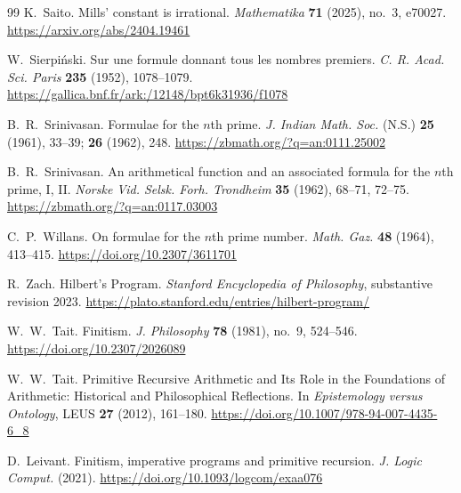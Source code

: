 \documentclass[11pt,reqno]{amsart}
\theoremstyle{blueplain}
\numberwithin{equation}{section}
\def\hyperlink#1#2{#2}}
\begin{document}
\begin{thebibliography}{99}
	K.~Saito.
	Mills' constant is irrational.
	\emph{Mathematika} \textbf{71} (2025), no.~3, e70027.
	\url{https://arxiv.org/abs/2404.19461}
	
	\hypertarget{abbr-source:Sierpinski1952}{}
	W.~Sierpi\'nski.
	Sur une formule donnant tous les nombres premiers.
	\hyperlink{abbr:journal-C-R-Acad-Sci-Paris}{\emph{C. R. Acad. Sci. Paris}} \textbf{235} (1952), 1078--1079.
	\url{https://gallica.bnf.fr/ark:/12148/bpt6k31936/f1078}
	
	\hypertarget{abbr-source:Srinivasan1961}{}
	B.~R.~Srinivasan.
	Formulae for the \(n\)th prime.
	\hyperlink{abbr:journal-J-Indian-Math-Soc}{\emph{J. Indian Math. Soc.}} (\hyperlink{abbr:N.S.}{N.S.}) \textbf{25} (1961), 33--39;
	\textbf{26} (1962), 248.
	\url{https://zbmath.org/?q=an:0111.25002}
	
	\hypertarget{abbr-source:Srinivasan1962}{}
	B.~R.~Srinivasan.
	An arithmetical function and an associated formula for the \(n\)th prime,
	I, II.
	\hyperlink{abbr:journal-Norske-Vid-Selsk-Forh-Trondheim}{\emph{Norske Vid. Selsk. Forh. Trondheim}}
	\textbf{35} (1962), 68--71, 72--75.
	\url{https://zbmath.org/?q=an:0117.03003}
	
	\hypertarget{abbr-source:Willans1964}{}
	C.~P.~Willans.
	On formulae for the \(n\)th prime number.
	\hyperlink{abbr:journal-Math-Gaz}{\emph{Math. Gaz.}} \textbf{48} (1964), 413--415.
	\url{https://doi.org/10.2307/3611701}
	
	R.~Zach.
	Hilbert's Program.
	\emph{Stanford Encyclopedia of Philosophy},
	substantive revision 2023.
	\url{https://plato.stanford.edu/entries/hilbert-program/}
	
	\hypertarget{abbr-source:Tait1981}{}
	W.~W.~Tait.
	Finitism.
	\hyperlink{abbr:journal-J-Philosophy}{\emph{J. Philosophy}} \textbf{78} (1981), no.~9, 524--546.
	\url{https://doi.org/10.2307/2026089}
	
	\hypertarget{abbr-source:Tait2012}{}
	W.~W.~Tait.
	Primitive Recursive Arithmetic and Its Role in the Foundations of
	Arithmetic: Historical and Philosophical Reflections.
	In \emph{Epistemology versus Ontology},
	\hyperlink{abbr:LEUS}{LEUS} \textbf{27} (2012), 161--180.
	\url{https://doi.org/10.1007/978-94-007-4435-6_8}
	
	\hypertarget{abbr-source:Leivant2021}{}
	D.~Leivant.
	Finitism, imperative programs and primitive recursion.
	\hyperlink{abbr:journal-J-Logic-Comput}{\emph{J. Logic Comput.}} (2021).
	\url{https://doi.org/10.1093/logcom/exaa076}
	

\end{thebibliography}
\end{document}
